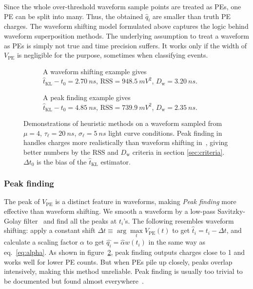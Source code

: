 Since the whole over-threshold waveform sample points are treated as PEs, one PE can be split into many. Thus, the obtained $\hat{q}_i$ are smaller than truth PE charges. The waveform shifting model formulated above captures the logic behind waveform superposition methods.  The underlying assumption to treat a waveform as PEs is simply not true and time precision suffers.  It works only if the width of $V_\mathrm{PE}$ is negligible for the purpose, sometimes when classifying events.

\begin{figure}[H]
  \begin{subfigure}{.5\textwidth}
    \centering
    \resizebox{\textwidth}{!}{}
    \caption{\label{fig:shifting} A waveform shifting example gives \\ $\hat{t}_\mathrm{KL}-t_0=\SI{2.70}{ns}$, $\mathrm{RSS}=\SI{948.5}{mV^2}$, $D_\mathrm{w}=\SI{3.20}{ns}$.}
  \end{subfigure}
  \begin{subfigure}{.5\textwidth}
    \centering
    \resizebox{\textwidth}{!}{}
    \caption{\label{fig:peak} A peak finding example gives \\ $\hat{t}_\mathrm{KL} - t_0=\SI{4.85}{ns}$, $\mathrm{RSS}=\SI{739.9}{mV^2}$, $D_\mathrm{w}=\SI{2.35}{ns}$.}
  \end{subfigure}
  \caption{\label{fig:method}Demonstrations of heuristic methods on a waveform sampled from $\mu=4$, $\tau_\ell=\SI{20}{ns}$, $\sigma_\ell=\SI{5}{ns}$ light curve conditions.  Peak finding in~ handles charges more realistically than waveform shifting in~, giving better numbers by the $\mathrm{RSS}$ and $D_\mathrm{w}$ criteria in section \ref{sec:criteria}. $\Delta t_0$ is the bias of the $\hat{t}_\mathrm{KL}$ estimator.}
\end{figure}

\subsubsection{Peak finding}
\label{sec:findpeak}

The peak of $V_\mathrm{PE}$ is a distinct feature in waveforms, making \textit{Peak finding} more effective than waveform shifting.  We smooth a waveform by a low-pass Savitzky-Golay filter~\cite{savitzky_smoothing_1964} and find all the peaks at $t_i$'s.  The following resembles waveform shifting: apply a constant shift $\Delta t \equiv \arg\underset{t}{\max} V_\mathrm{PE}(t)$ to get $\hat{t}_i = t_i - \Delta t$, and calculate a scaling factor $\alpha$ to get $\hat{q_i}=\hat{\alpha} w(t_i)$ in the same way as eq.~\eqref{eq:alpha}.  As shown in figure~\ref{fig:peak}, peak finding outputs charges close to 1 and works well for lower PE counts.  But when PEs pile up closely, peaks overlap intensively, making this method unreliable.  Peak finding is usually too trivial to be documented but found almost everywhere~\cite{students22}.

